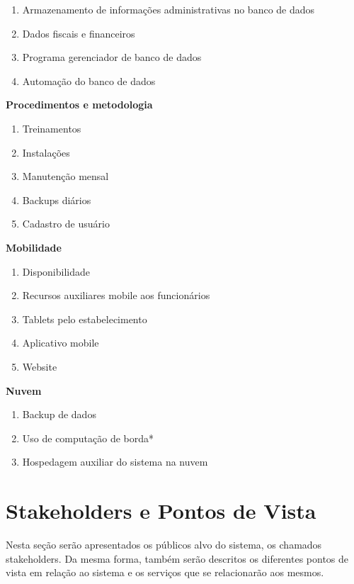 \begin{enumerate}
	\item Armazenamento de informações administrativas no banco de dados
	\item Dados fiscais e financeiros
	\item Programa gerenciador de banco de dados
	\item Automação do banco de dados
\end{enumerate}
\textbf{Procedimentos e metodologia}
\begin{enumerate}
	\item Treinamentos
	\item Instalações
	\item Manutenção mensal
	\item Backups diários
	\item Cadastro de usuário
\end{enumerate}
\textbf{Mobilidade}
\begin{enumerate}
	\item Disponibilidade 
	\item Recursos auxiliares mobile aos funcionários
	\item Tablets pelo estabelecimento
	\item Aplicativo mobile
	\item Website 
\end{enumerate}
\textbf{Nuvem}
\begin{enumerate}
	\item Backup de dados
	\item Uso de computação de borda*
	\item Hospedagem auxiliar do sistema na nuvem
\end{enumerate}

\section{Stakeholders e Pontos de Vista}

Nesta seção serão apresentados os públicos alvo do sistema, os chamados stakeholders. Da mesma forma, também serão descritos os diferentes pontos de vista em relação ao sistema e os serviços que se relacionarão aos mesmos.

